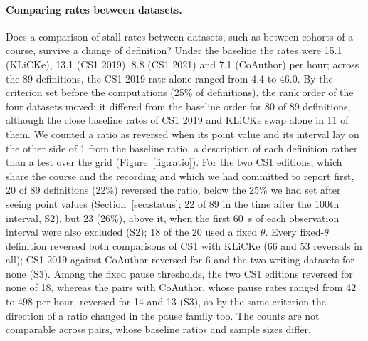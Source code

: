 \paragraph{Comparing rates between datasets.}
\label{sec:res-ratio}
Does a comparison of stall rates between datasets, such as between cohorts of a course, survive a change of
definition? Under the baseline the rates were
15.1 (KLiCKe), 13.1 (CS1 2019), 8.8 (CS1 2021) and 7.1 (CoAuthor) per hour; across the 89 definitions, the CS1 2019
rate alone ranged from 4.4 to 46.0. By the criterion set before the computations (25\% of definitions), the rank
order of the four datasets moved: it differed from the baseline order for 80 of 89 definitions, although the close
baseline rates of CS1 2019 and KLiCKe swap alone in 11 of them. We counted a ratio as reversed when its point value and its
interval lay on the other side of 1 from the baseline ratio, a description of each definition rather than a test over
the grid (Figure~\ref{fig:ratio}). For the two CS1 editions,
which share the course and the recording and which we had committed to report first, 20 of 89 definitions (22\%)
reversed the ratio, below the 25\% we had set after seeing point values (Section~\ref{sec:status}; 22 of 89 in
the time after the 100th interval, S2), but 23 (26\%), above it, when the first 60~s of each observation interval
were also excluded (S2); 18 of the 20 used a fixed $\theta$. Every fixed-$\theta$ definition reversed both comparisons of
CS1 with KLiCKe (66 and 53 reversals in all); CS1 2019 against CoAuthor reversed for 6 and the two
writing datasets for none (S3). Among the
fixed pause thresholds, the two CS1 editions reversed for none of 18, whereas the pairs with CoAuthor, whose pause rates
ranged from 42 to 498 per hour, reversed for 14 and 13 (S3), so by the same criterion the direction of a ratio changed in the pause family too. The
counts are not comparable across pairs, whose
baseline ratios and sample sizes differ.

